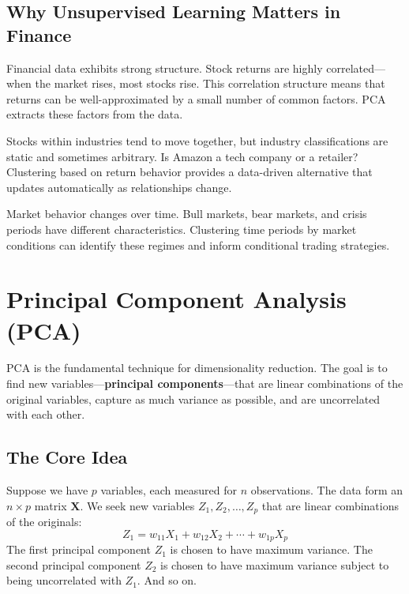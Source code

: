 \documentclass[11pt,a4paper]{article}
\newcommand{\keyword}[1]{\textbf{\textcolor{AccentOrange}{#1}}}
\begin{document}
\subsection{Why Unsupervised Learning Matters in Finance}

Financial data exhibits strong structure. Stock returns are highly correlated---when the market rises, most stocks rise. This correlation structure means that returns can be well-approximated by a small number of common factors. PCA extracts these factors from the data.

Stocks within industries tend to move together, but industry classifications are static and sometimes arbitrary. Is Amazon a tech company or a retailer? Clustering based on return behavior provides a data-driven alternative that updates automatically as relationships change.

Market behavior changes over time. Bull markets, bear markets, and crisis periods have different characteristics. Clustering time periods by market conditions can identify these regimes and inform conditional trading strategies.

\section{Principal Component Analysis (PCA)}

PCA is the fundamental technique for dimensionality reduction. The goal is to find new variables---\keyword{principal components}---that are linear combinations of the original variables, capture as much variance as possible, and are uncorrelated with each other.

\subsection{The Core Idea}

Suppose we have $p$ variables, each measured for $n$ observations. The data form an $n \times p$ matrix $\mathbf{X}$. We seek new variables $Z_1, Z_2, \ldots, Z_p$ that are linear combinations of the originals:
\[
Z_1 = w_{11} X_1 + w_{12} X_2 + \cdots + w_{1p} X_p
\]
The first principal component $Z_1$ is chosen to have maximum variance. The second principal component $Z_2$ is chosen to have maximum variance subject to being uncorrelated with $Z_1$. And so on.
\end{document}
